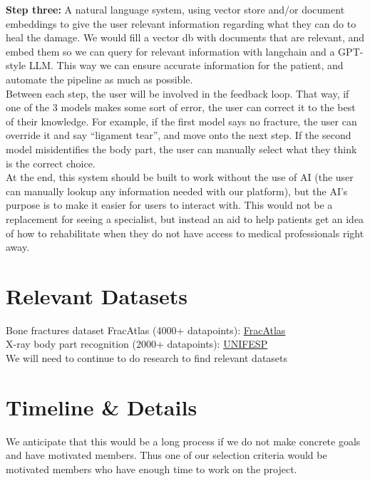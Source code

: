\documentclass[runningheads]{llncs}
\begin{document}
\textbf{Step three:}  A natural language system, using vector store and/or document embeddings to give the user relevant information regarding what they can do to heal the damage. We would fill a vector db with documents that are relevant, and embed them so we can query for relevant information with langchain and a GPT-style LLM. This way we can ensure accurate information for the patient, and automate the pipeline as much as possible.\\

\noindent Between each step, the user will be involved in the feedback loop. That way, if one of the 3 models makes some sort of error, the user can correct it to the best of their knowledge. For example, if the first model says no fracture, the user can override it and say “ligament tear”, and move onto the next step. If the second model misidentifies the body part, the user can manually select what they think is the correct choice.\\

\noindent At the end, this system should be built to work without the use of AI (the user can manually lookup any information needed with our platform), but the AI’s purpose is to make it easier for users to interact with. This would not be a replacement for seeing a specialist, but instead an aid to help patients get an idea of how to rehabilitate when they do not have access to medical professionals right away.

\section{Relevant Datasets}

Bone fractures dataset FracAtlas (4000+ datapoints): 
\href{https://figshare.com/articles/dataset/The_dataset/22363012}{FracAtlas}\\

\noindent X-ray body part recognition (2000+ datapoints): \href{https://www.kaggle.com/competitions/unifesp-x-ray-body-part-classifier}{UNIFESP}\\

\noindent We will need to continue to do research to find relevant datasets

\section{Timeline \& Details}

We anticipate that this would be a long process if we do not make concrete goals and have motivated members. Thus one of our selection criteria would be motivated members who have enough time to work on the project. \\
\end{document}

